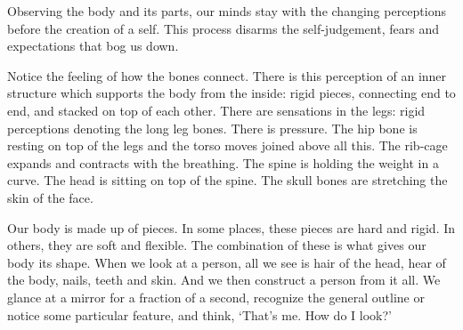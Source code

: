 
Observing the body and its parts, our minds stay with the changing
perceptions before the creation of a self. This process disarms the
self-judgement, fears and expectations that bog us down.

Notice the feeling of how the bones connect. There is this perception of
an inner structure which supports the body from the inside: rigid
pieces, connecting end to end, and stacked on top of each other. There
are sensations in the legs: rigid perceptions denoting the long leg
bones. There is pressure. The hip bone is resting on top of the legs and
the torso moves joined above all this. The rib-cage expands and
contracts with the breathing. The spine is holding the weight in a
curve. The head is sitting on top of the spine. The skull bones are
stretching the skin of the face.

Our body is made up of pieces. In some places, these pieces are hard and
rigid. In others, they are soft and flexible. The combination of these
is what gives our body its shape. When we look at a person, all we see
is hair of the head, hear of the body, nails, teeth and skin. And we
then construct a person from it all. We glance at a mirror for a
fraction of a second, recognize the general outline or notice some
particular feature, and think, `That's me. How do I look?'

\clearpage
\figurepagelayout

